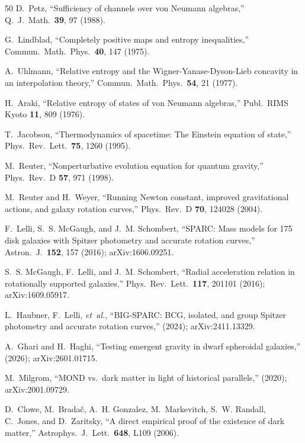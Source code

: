 \documentclass[prl,twocolumn,superscriptaddress,longbibliography,floatfix]{revtex4-2}
\begin{document}
\begin{thebibliography}{50}
D.~Petz,
``Sufficiency of channels over von Neumann algebras,''
Q.\ J.\ Math.\ \textbf{39}, 97 (1988).

G.~Lindblad,
``Completely positive maps and entropy inequalities,''
Commun.\ Math.\ Phys.\ \textbf{40}, 147 (1975).

A.~Uhlmann,
``Relative entropy and the Wigner-Yanase-Dyson-Lieb concavity
in an interpolation theory,''
Commun.\ Math.\ Phys.\ \textbf{54}, 21 (1977).

H.~Araki,
``Relative entropy of states of von Neumann algebras,''
Publ.\ RIMS Kyoto \textbf{11}, 809 (1976).

T.~Jacobson,
``Thermodynamics of spacetime: The Einstein equation of state,''
Phys.\ Rev.\ Lett.\ \textbf{75}, 1260 (1995).

M.~Reuter,
``Nonperturbative evolution equation for quantum gravity,''
Phys.\ Rev.\ D \textbf{57}, 971 (1998).

M.~Reuter and H.~Weyer,
``Running Newton constant, improved gravitational actions, and
galaxy rotation curves,''
Phys.\ Rev.\ D \textbf{70}, 124028 (2004).

F.~Lelli, S.~S. McGaugh, and J.~M. Schombert,
``SPARC: Mass models for 175 disk galaxies with Spitzer
photometry and accurate rotation curves,''
Astron.\ J.\ \textbf{152}, 157 (2016); arXiv:1606.09251.

S.~S. McGaugh, F.~Lelli, and J.~M. Schombert,
``Radial acceleration relation in rotationally supported
galaxies,''
Phys.\ Rev.\ Lett.\ \textbf{117}, 201101 (2016);
arXiv:1609.05917.

L.~Haubner, F.~Lelli, \emph{et~al.},
``BIG-SPARC: BCG, isolated, and group Spitzer photometry and
accurate rotation curves,''
(2024); arXiv:2411.13329.

A.~Ghari and H.~Haghi,
``Testing emergent gravity in dwarf spheroidal galaxies,''
(2026); arXiv:2601.01715.

M.~Milgrom,
``MOND vs.\ dark matter in light of historical parallels,''
(2020); arXiv:2001.09729.

D.~Clowe, M.~Brada\v{c}, A.~H. Gonzalez, M.~Markevitch,
S.~W. Randall, C.~Jones, and D.~Zaritsky,
``A direct empirical proof of the existence of dark matter,''
Astrophys.\ J.\ Lett.\ \textbf{648}, L109 (2006).


\end{thebibliography}
\end{document}
